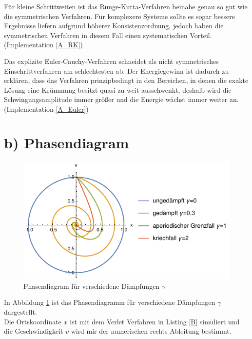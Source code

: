 Für kleine Schrittweiten ist das Runge-Kutta-Verfahren beinahe genau so gut wie die symmetrischen Verfahren. Für komplexere Systeme sollte es sogar bessere Ergebnisse liefern aufgrund höherer Konsistenzordnung, jedoch haben die symmetrischen Verfahren in diesem Fall einen systematischen Vorteil. (Implementation \ref{A_RK})

Das explizite Euler-Cauchy-Verfahren schneidet als nicht symmetrisches Einschrittverfahren am schlechtesten ab. Der \grqq{}Energiegewinn\grqq{} ist dadurch zu erklären, dass das Verfahren prinzipbedingt in den Bereichen, in denen die exakte Lösung eine Krümmung besitzt quasi zu weit ausschwenkt, deshalb wird die Schwingungsamplitude immer größer und die Energie wächst immer weiter an. (Implementation \ref{A_Euler})


\section*{b) Phasendiagram}
\begin{figure}[h!]
	\centering
	\includegraphics[width=400pt]{B_Phase.pdf}
	\caption{Phasendiagram für verschiedene Dämpfungen $\gamma$}
	\label{fig:phase}
\end{figure}
In Abbildung \ref{fig:phase} ist das Phasendiagramm für verschiedene Dämpfungen $\gamma$ dargestellt.\\
Die Ortskoordinate $x$ ist mit dem Verlet Verfahren in Listing \ref{B} simuliert und die Geschwindigkeit $v$ wird mir der numerischen rechts Ableitung bestimmt.

